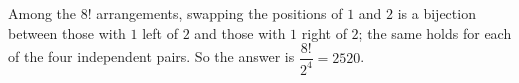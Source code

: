 Among the $8!$ arrangements, swapping the positions of $1$ and $2$ is a bijection between those with $1$ left of $2$ and those with $1$ right of $2$; the same holds for each of the four independent pairs. So the answer is $\dfrac{8!}{2^4}=\boxed{2520}$.

